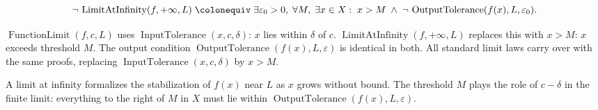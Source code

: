 \begin{remark*}
\[
  \neg\,\operatorname{LimitAtInfinity}(f,+\infty,L)
  \;\colonequiv\;
  \exists\varepsilon_0>0,\;\forall M,\;\exists x\in X:\;
  x>M \;\wedge\;
  \neg\,\operatorname{OutputTolerance}(f(x),L,\varepsilon_0).
\]
\end{remark*}

\begin{remark*}
$\operatorname{FunctionLimit}(f,c,L)$ uses
$\operatorname{InputTolerance}(x,c,\delta)$: $x$ lies within $\delta$
of $c$. $\operatorname{LimitAtInfinity}(f,+\infty,L)$ replaces this
with $x>M$: $x$ exceeds threshold $M$. The output condition
$\operatorname{OutputTolerance}(f(x),L,\varepsilon)$ is identical
in both. All standard limit laws carry over with the same proofs,
replacing $\operatorname{InputTolerance}(x,c,\delta)$ by $x>M$.
\end{remark*}

\begin{remark*}[Interpretation]
A limit at infinity formalizes the stabilization of $f(x)$ near $L$
as $x$ grows without bound. The threshold $M$ plays the role of
$c-\delta$ in the finite limit: everything to the right of $M$ in
$X$ must lie within $\operatorname{OutputTolerance}(f(x),L,\varepsilon)$.
\end{remark*}
